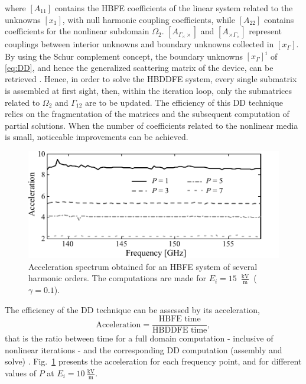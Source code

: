 \noindent where $[A_{11}]$ contains the HBFE coefficients of the linear system
related to the unknowns $[x_{1}]$, with
null harmonic coupling coefficients, while $[A_{22}]$ contains coefficients for
the nonlinear subdomain $\Omega_2$. ${[A_{\Gamma_\times \times}]}$ and ${[A_{ \times \Gamma_\times}]}$
represent couplings between interior unknowns and 
boundary unknowns collected in $[x_\Gamma]$. 
By using the Schur complement concept, the boundary unknowns $[x_\Gamma]^{i}$ of
\eqref{eq:DD}, and hence the generalized scattering matrix of the device, can be retrieved \cite{Guarnieri2010, Guarnieri2009}.
Hence, in order to solve the HBDDFE system,
every single submatrix is assembled at first sight, then, within the iteration
loop, only the submatrices related to $\Omega_2$ and $\Gamma_{12}$ are to be
updated. The efficiency of this 
DD technique relies on the fragmentation of the
matrices and the subsequent computation of partial solutions. When the number
of coefficients related to the nonlinear media is small, noticeable
improvements can be achieved.

\begin{figure}[!ht]
\centering
\includegraphics[width=14cm]{acceleration}
\caption{Acceleration spectrum obtained for an HBFE system of several harmonic
orders. The computations are made for $E_i = 15$~${\frac{\mathrm{kV}}{\mathrm{m}}}$~($\gamma = 0.1$).}
\label{fig:acceleration}
\end{figure}

The efficiency of the DD technique can be
assessed by its acceleration,
$$\text{Acceleration} = \frac{\text{HBFE time}}{\text{HBDDFE time}},$$
\noindent that is the ratio between time for a full domain
computation - inclusive of nonlinear iterations - and the corresponding DD
computation (assembly and solve) \cite{Guarnieri2010}. Fig.~\ref{fig:acceleration} presents the acceleration for each frequency point, and for different values of $P$ at  $E_i = 10~{\frac{\mathrm{kV}}{\mathrm{m}}}$. 

